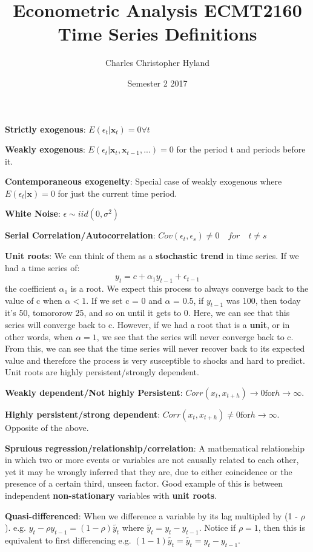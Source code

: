 \documentclass[11pt, oneside]{article}
\title{Econometric Analysis ECMT2160 Time Series Definitions}
\author{Charles Christopher Hyland}
\date{Semester 2 2017}
\theoremstyle{definition}
\begin{document}
\maketitle
\newpage
{}
\textbf{Strictly exogenous}: $E(\epsilon_t|\bm{x}_t) = 0 \forall t$

\textbf{Weakly exogenous}: $E(\epsilon_t|\bm{x}_t, \bm{x}_{t-1},...) = 0$ for the period t and periods before it.

\textbf{Contemporaneous exogeneity}: Special case of weakly exogenous where $E(\epsilon_t|\bm{x}) = 0$ for just the current time period.

\textbf{White Noise}: $\epsilon \sim iid(0,\sigma^2)$

\textbf{Serial Correlation/Autocorrelation}: $Cov(\epsilon_t,\epsilon_s) \neq 0 \quad for \quad t \neq s$

\textbf{Unit roots}: We can think of them as a \textbf{stochastic trend} in time series. If we had a time series of:
$$
y_t = c + \alpha_1y_{t-1} + \epsilon_{t-1}
$$
the coefficient $\alpha_1$ is a root. We expect this process to always converge back to the value of c when $\alpha < 1$. If we set c = 0 and $\alpha$ = 0.5, if $y_{t-1}$ was 100, then today it's 50, tomororow 25, and so on until it gets to 0. Here, we can see that this series will converge back to c. However, if we had a root that is a \textbf{unit}, or in other words, when $\alpha = 1$, we see that the series will never converge back to c. From this, we can see that the time series will never recover back to its expected value and therefore the process is very susceptible to shocks and hard to predict. Unit roots are highly persistent/strongly dependent.

\textbf{Weakly dependent/Not highly Persistent}: $Corr(x_t,x_{t+h}) \rightarrow 0 \text{for} h \rightarrow \infty$.

\textbf{Highly persistent/strong dependent}: $Corr(x_t,x_{t+h}) \neq 0 \text{for} h \rightarrow \infty$. Opposite of the above.

\textbf{Spruious regression/relationship/correlation}: A mathematical relationship in which two or more events or variables are not causally related to each other, yet it may be wrongly inferred that they are, due to either coincidence or the presence of a certain third, unseen factor. Good example of this is between independent \textbf{non-stationary} variables with \textbf{unit roots}.

\textbf{Quasi-differenced}: When we difference a variable by its lag multipled by (1 - $\rho$). e.g. $y_t - \rho y_{t-1} = (1 - \rho)\tilde{y_t}$ where $\tilde{y_t} = y_t - y_{t-1}$. Notice if $\rho = 1$, then this is equivalent to first differencing e.g. $(1-1)\tilde{y_t} = \tilde{y_t} = y_t - y_{t-1}$.
\end{document}
